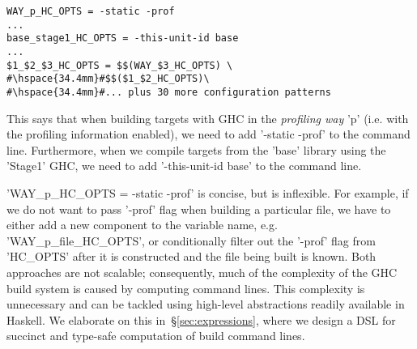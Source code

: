 \begin{lstlisting}
WAY_p_HC_OPTS = -static -prof
...
base_stage1_HC_OPTS = -this-unit-id base
...
$1_$2_$3_HC_OPTS = $$(WAY_$3_HC_OPTS) \
#\hspace{34.4mm}#$$($1_$2_HC_OPTS)\
#\hspace{34.4mm}#... plus 30 more configuration patterns
\end{lstlisting}

\noindent This says that when building targets with GHC in the \emph{profiling
way} \lst'p' (i.e. with the profiling information enabled), we need to add
\lst'-static -prof' to the command line. Furthermore, when we compile targets
from the \lst'base' library using the \lst'Stage1' GHC, we need to add
\lst'-this-unit-id base' to the command line. 

\lst'WAY_p_HC_OPTS = -static -prof' is concise, but is inflexible. For example,
if we do not want to pass \lst'-prof' flag when building a particular file, we
have to either add a new component to the variable name, e.g.
\lst'WAY_p_file_HC_OPTS', or conditionally filter out the \lst'-prof' flag from
\lst'HC_OPTS' after it is constructed and the file being built is known. Both
approaches are not scalable; consequently, much of the complexity of the GHC
build system is caused by computing command lines. This complexity is
unnecessary and can be tackled using high-level abstractions readily available
in Haskell. We elaborate on this in~\S\ref{sec:expressions}, where we design a
DSL for succinct and type-safe computation of build command lines.

% 
% 

